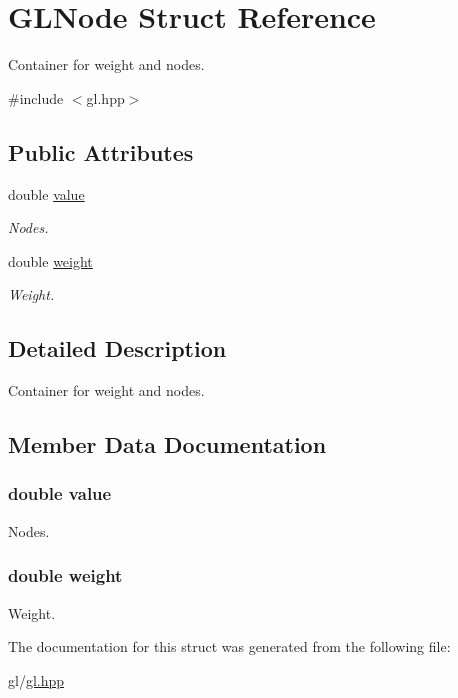 \hypertarget{structgl_1_1GLNode}{\section{G\+L\+Node Struct Reference}
\label{structgl_1_1GLNode}
}


Container for weight and nodes.  




{\ttfamily \#include $<$gl.\+hpp$>$}

\subsection*{Public Attributes}
\begin{DoxyCompactItemize}
\item 
double \hyperlink{structgl_1_1GLNode_aee90379adb0307effb138f4871edbc5c}{value}
\begin{DoxyCompactList}\small\item\em Nodes. \end{DoxyCompactList}\item 
double \hyperlink{structgl_1_1GLNode_a99108733d00274978a4979dc072bd513}{weight}
\begin{DoxyCompactList}\small\item\em Weight. \end{DoxyCompactList}\end{DoxyCompactItemize}


\subsection{Detailed Description}
Container for weight and nodes. 

\subsection{Member Data Documentation}
\hypertarget{structgl_1_1GLNode_aee90379adb0307effb138f4871edbc5c}{
\subsubsection[{value}]{\setlength{\rightskip}{0pt plus 5cm}double value}}\label{structgl_1_1GLNode_aee90379adb0307effb138f4871edbc5c}


Nodes. 

\hypertarget{structgl_1_1GLNode_a99108733d00274978a4979dc072bd513}{
\subsubsection[{weight}]{\setlength{\rightskip}{0pt plus 5cm}double weight}}\label{structgl_1_1GLNode_a99108733d00274978a4979dc072bd513}


Weight. 



The documentation for this struct was generated from the following file\+:\begin{DoxyCompactItemize}
\item 
gl/\hyperlink{gl_8hpp}{gl.\+hpp}\end{DoxyCompactItemize}
